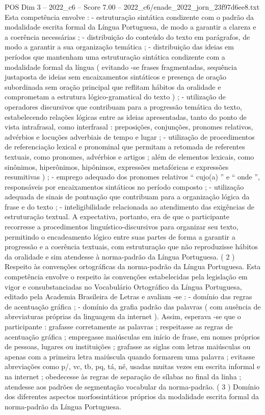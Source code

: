\begin{textsample}{POS Dim 3 – 2022\_c6 – Score 7.00 – 2022\_c6/enade\_2022\_jorn\_23f97d6ee8.txt}
Esta competência envolve : - estruturação sintática condizente com o padrão da modalidade escrita formal da Língua Portuguesa, de modo a garantir a clareza e a coerência necessárias ; - distribuição do conteúdo do texto em parágrafos, de modo a garantir a sua organização temática ; - distribuição das ideias em períodos que mantenham uma estruturação sintática condizente com a modalidade formal da língua ( evitando -se frases fragmentadas, sequência justaposta de ideias sem encaixamentos sintáticos e presença de oração subordinada sem oração principal que reflitam hábitos da oralidade e comprometam a estrutura lógico-gramatical do texto ) ; - utilização de operadores discursivos que contribuam para a progressão temática do texto, estabelecendo relações lógicas entre as ideias apresentadas, tanto do ponto de vista intrafrasal, como interfrasal : preposições, conjunções, pronomes relativos, advérbios e locuções adverbiais de tempo e lugar ; - utilização de procedimentos de referenciação lexical e pronominal que permitam a retomada de referentes textuais, como pronomes, advérbios e artigos ; além de elementos lexicais, como sinônimos, hiperônimos, hipônimos, expressões metafóricas e expressões resumitivas ) ; - emprego adequado dos pronomes relativos “ cujo(a) ” e “ onde ”, responsáveis por encaixamentos sintáticos no período composto ; - utilização adequada de sinais de pontuação que contribuam para a organização lógica da frase e do texto ; - inteligibilidade relacionada ao atendimento das exigências de estruturação textual.
A expectativa, portanto, era de que o participante recorresse a procedimentos linguístico-discursivos para organizar seu texto, permitindo o encadeamento lógico entre suas partes de forma a garantir a progressão e a coerência textuais, com estruturação que não reproduzisse hábitos da oralidade e sim atendesse à norma-padrão da Língua Portuguesa. ( 2 ) Respeito às convenções ortográficas da norma-padrão da Língua Portuguesa.
Esta competência envolve o respeito às convenções estabelecidas pela legislação em vigor e consubstanciadas no Vocabulário Ortográfico da Língua Portuguesa, editado pela Academia Brasileira de Letras e avaliam -se : - domínio das regras de acentuação gráfica ; - domínio da grafia padrão das palavras ( com ausência de abreviaturas próprias da linguagem da internet ).
Assim, esperava -se que o participante : grafasse corretamente as palavras ; respeitasse as regras de acentuação gráfica ; empregasse maiúsculas em início de frase, em nomes próprios de pessoas, lugares ou instituições ; grafasse as siglas com letras maiúsculas ou apenas com a primeira letra maiúscula quando formarem uma palavra ; evitasse abreviações como p/, vc, tb, pq, tá, né, usadas muitas vezes em escrita informal e na internet ; obedecesse às regras de separação de sílabas no final da linha ; atendesse aos padrões de segmentação vocabular da norma-padrão. ( 3 ) Domínio dos diferentes aspectos morfossintáticos próprios da modalidade escrita formal da norma-padrão da Língua Portuguesa.

\end{textsample}
